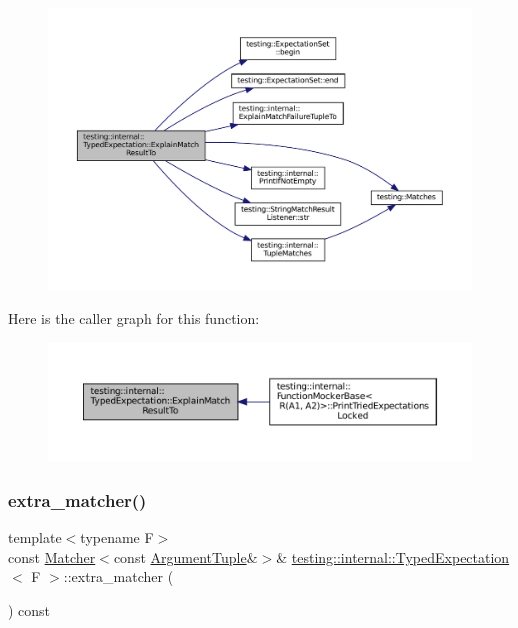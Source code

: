 \begin{figure}[H]
\begin{center}
\leavevmode
\includegraphics[width=350pt]{classtesting_1_1internal_1_1TypedExpectation_ad72e021fb66b7a91613e84644c6eb78b_cgraph}
\end{center}
\end{figure}
Here is the caller graph for this function\+:
\nopagebreak
\begin{figure}[H]
\begin{center}
\leavevmode
\includegraphics[width=350pt]{classtesting_1_1internal_1_1TypedExpectation_ad72e021fb66b7a91613e84644c6eb78b_icgraph}
\end{center}
\end{figure}
\mbox{\label{classtesting_1_1internal_1_1TypedExpectation_a0ee00342b872ae257cae31bc86b9a34b}} 
\subsubsection{\texorpdfstring{extra\+\_\+matcher()}{extra\_matcher()}}
{\footnotesize\ttfamily template$<$typename F$>$ \\
const \hyperlink{classtesting_1_1Matcher}{Matcher}$<$const \hyperlink{classtesting_1_1internal_1_1TypedExpectation_a9a91379262d101f435809ba4556d14fa}{Argument\+Tuple}\&$>$\& \hyperlink{classtesting_1_1internal_1_1TypedExpectation}{testing\+::internal\+::\+Typed\+Expectation}$<$ F $>$\+::extra\+\_\+matcher (\begin{DoxyParamCaption}{ }\end{DoxyParamCaption}) const\hspace{0.3cm}{\ttfamily [inline]}}



